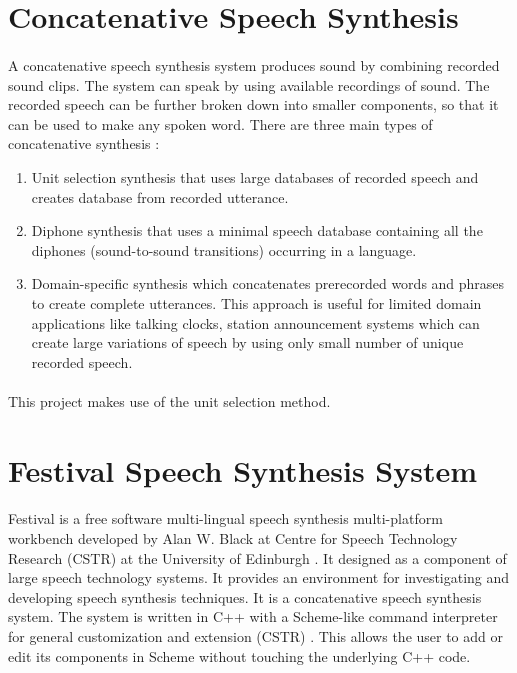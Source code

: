 \documentclass{report}
\begin{document}
		\section{Concatenative Speech Synthesis}
			\paragraph{}
				A concatenative speech synthesis system produces sound by combining recorded sound clips. The system can speak by using available recordings of sound. The recorded speech can be further broken down into smaller components, so that it can be used to make any spoken word. There are three main types of concatenative synthesis \cite{HINDITTS:5}:
				\begin{enumerate}
					\item Unit selection synthesis that uses large databases of recorded speech and creates database from recorded utterance.
					\item Diphone synthesis that uses a minimal speech database containing all the diphones (sound-to-sound transitions) occurring in a language.
					\item Domain-specific synthesis which concatenates prerecorded words and phrases to create complete utterances. This approach is useful for limited domain applications like talking clocks, station announcement systems which can create large variations of speech by using only small number of unique recorded speech. 
				\end{enumerate}
		
		\paragraph{}
			This project makes use of the unit selection method.
	
		\section{Festival Speech Synthesis System}
			\paragraph{}
				Festival is a free software multi-lingual speech synthesis multi-platform workbench developed by Alan W. Black at Centre for Speech Technology Research (CSTR) at the University of Edinburgh \cite{FESTIVAL:2}. It designed as a component of large speech technology systems. It provides an environment for investigating  and developing speech synthesis techniques. It is a concatenative speech synthesis system. The system is written in C++ with a Scheme-like command interpreter for general customization and extension (CSTR) \cite{FESTIVAL:2}. This allows the user to add or edit its components in Scheme without touching the underlying C++ code.
	
\end{document}
